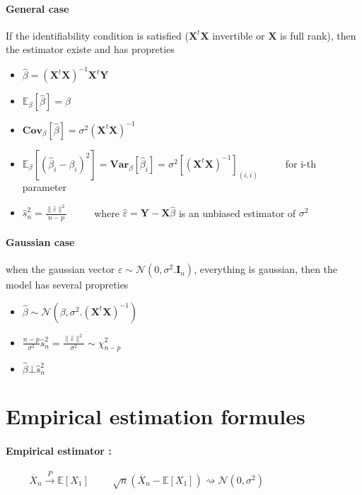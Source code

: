 \documentclass[a4paper,10pt]{article}
\begin{document}
\paragraph{General case} If the identifiability condition is satisfied ($\textbf{X}^t \textbf{X}$ invertible or $\textbf{X}$ is full rank), then the estimator existe and has propreties
\begin{itemize}
 \item $\widehat{\beta} = (\textbf{X}^t \textbf{X})^{-1} \textbf{X}^t \textbf{Y} $
 \item $\mathbb{E}_{\beta}[\widehat{\beta}] = \beta $
 \item $\textbf{Cov}_{\beta}[\widehat{\beta}] = \sigma^2 (\textbf{X}^t \textbf{X})^{-1} $
 \item $\mathbb{E}_{\beta}[(\widehat{\beta}_i - \beta_i)^2 ] = \textbf{Var}_{\beta}[\widehat{\beta}_i] = \sigma^2 [(\textbf{X}^t \textbf{X})^{-1}]_{(i,i)} \hspace{1cm}$ for i-th parameter
 \item $\widehat{s}^2_n = \frac{\|\widehat{\varepsilon}\|^2}{n-p} \hspace{1cm}$ where $\widehat{\varepsilon} = \textbf{Y} - \textbf{X}\widehat{\beta} $ is an unbiased estimator of $\sigma^2$
\end{itemize}
\paragraph{Gaussian case} when the gaussian vector $\varepsilon \sim \mathcal{N}(0,\sigma^2.\textbf{I}_n)$, everything is gaussian, then the model has several propreties
\begin{itemize}
 \item $\widehat{\beta} \sim \mathcal{N}(\beta,\sigma^2.(\textbf{X}^t \textbf{X})^{-1}) $
 \item $\frac{n-p}{\sigma^2} \widehat{s}^2_n = \frac{\|\widehat{\varepsilon}\|^2}{\sigma^2} \sim \chi^2_{n-p}  $
 \item $\widehat{\beta} \bot \widehat{s}^2_n $
\end{itemize}

\section{Empirical estimation formules}
\paragraph{Empirical estimator : }$\hspace{1cm} \overline{X}_n\xrightarrow{P} \mathbb{E}[X_{1}] \hspace{1cm} \sqrt{n}(\overline{X}_n -\mathbb{E}[X_{1}]) \rightsquigarrow   \mathcal{N}(0,\sigma^2) $
\end{document}
